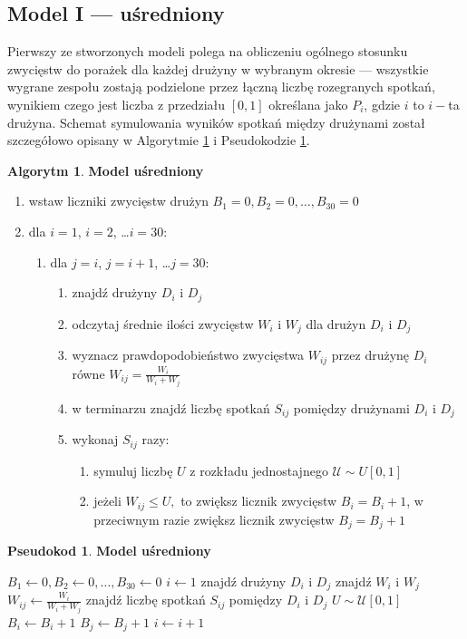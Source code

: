 \documentclass[inzynierska]{pwr_wmat_praca_dyplomowa}
\theoremstyle{plain}
\numberwithin{theorem}{chapter}
\theoremstyle{definition}
\numberwithin{theorem}{chapter}
\newtheorem{algorytm}[theorem]{Algorytm}
\newtheorem{pseudokod}[theorem]{Pseudokod}
\begin{document}
\subsection{Model I --- uśredniony}
Pierwszy ze stworzonych modeli polega na obliczeniu ogólnego stosunku zwycięstw do porażek dla każdej drużyny w wybranym okresie --- wszystkie wygrane zespołu zostają podzielone przez łączną liczbę rozegranych spotkań, wynikiem czego jest liczba z przedziału $[0,1]$ określana jako $P_{i}$, gdzie $i$ to $i-$ta drużyna. Schemat symulowania wyników spotkań między drużynami został szczegółowo opisany w Algorytmie \ref{algorytm1} i Pseudokodzie \ref{pseudokod1}.

\begin{algorytm} \label{algorytm1}
	\textbf{Model uśredniony}
	\begin{enumerate}
	\item wstaw liczniki zwycięstw drużyn $B_1= 0,B_2= 0,\dots, B_{30}= 0$
	\item dla $i=1$, $i=2$, \dots $i=30$: 
	\begin{enumerate}
		\item dla $j=i$, $j=i+1$, \dots $j=30$: 
		\begin{enumerate}
			\item znajdź drużyny $D_i$ i $D_j$
		\item odczytaj średnie ilości zwycięstw $W_i$ i $W_j$ dla drużyn $D_i$ i $D_j$ 
		\item wyznacz prawdopodobieństwo zwycięstwa $W_{ij}$ przez drużynę  $D_i$ równe $W_{ij}=\frac{W_i}{W_i + W_j}$   
		\item w terminarzu znajdź liczbę spotkań $S_{ij}$ pomiędzy drużynami $D_i$ i $D_j$
		\item wykonaj $S_{ij}$ razy:
			\begin{enumerate}
				\item symuluj liczbę $U$ z rozkładu jednostajnego $\mathcal{U}\sim U[0,1]$ 
			\item jeżeli $W_{ij} \leq U,$ to zwiększ licznik zwycięstw $B_i=B_i+1$, w przeciwnym razie zwiększ licznik zwycięstw $B_j=B_j+1$
			\end{enumerate}
		\end{enumerate}
	\end{enumerate}
\end{enumerate}
\end{algorytm} 
 
\begin{pseudokod} \label{pseudokod1}
	\textbf{Model uśredniony}
	\begin{algorithmic}[1]
		\State $B_1\gets 0,B_2\gets 0,\dots, B_{30}\gets 0$
		\State $i\gets 1$
		\State znajdź drużyny $D_i$ i $D_j$
		\State znajdź $W_i$ i $W_j$ 
		\State $W_{ij}\gets\frac{W_i}{W_i + W_j}$
		\State znajdź liczbę spotkań $S_{ij}$ pomiędzy $D_i$ i $D_j$
		\State $U\sim \mathcal{U}[0,1]$
		\State $B_i \gets B_i+1$
		\Else
		\State $B_j \gets B_j+1$
		\EndIf
		\EndFor
		\EndFor
		\State $i\gets i+1$
		\EndWhile
	\end{algorithmic}
\end{pseudokod}
\end{document}
